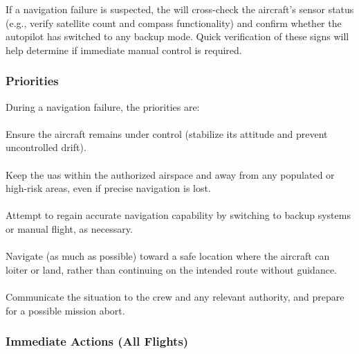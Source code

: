            If a navigation failure is suspected, the  will cross-check the aircraft’s sensor status (e.g., verify satellite count and compass functionality) and confirm whether the autopilot has switched to any backup mode. Quick verification of these signs will help determine if immediate manual control is required.
             
            \subsubsection{Priorities}During a navigation failure, the priorities are:
            
                \paragraph{}Ensure the aircraft remains under control (stabilize its attitude and prevent uncontrolled drift).
                
                \paragraph{}Keep the \ac{uas} within the authorized airspace and away from any populated or high-risk areas, even if precise navigation is lost.
                
                \paragraph{}Attempt to regain accurate navigation capability by switching to backup systems or manual flight, as necessary.
                
                \paragraph{}Navigate (as much as possible) toward a safe location where the aircraft can loiter or land, rather than continuing on the intended route without guidance.
                
                \paragraph{}Communicate the situation to the crew and any relevant authority, and prepare for a possible mission abort.
            
            \subsubsection{Immediate Actions (All Flights)}
            
